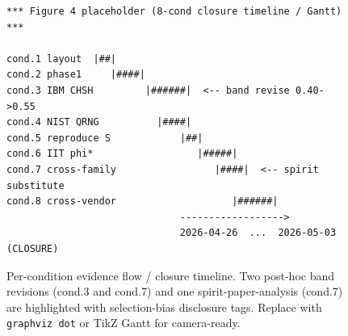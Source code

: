 \begin{figure}[htbp]
\centering
\begin{lstlisting}[basicstyle=\ttfamily\tiny,frame=single,framesep=4pt]
*** Figure 4 placeholder (8-cond closure timeline / Gantt) ***

cond.1 layout  |##|
cond.2 phase1     |####|
cond.3 IBM CHSH         |######|  <-- band revise 0.40->0.55
cond.4 NIST QRNG          |####|
cond.5 reproduce S            |##|
cond.6 IIT phi*                  |#####|
cond.7 cross-family                 |####|  <-- spirit substitute
cond.8 cross-vendor                    |######|
                              ------------------>
                              2026-04-26  ...  2026-05-03 (CLOSURE)
\end{lstlisting}
\caption{Per-condition evidence flow / closure timeline. Two
post-hoc band revisions (cond.3 and cond.7) and one
spirit-paper-analysis (cond.7) are highlighted with selection-bias
disclosure tags. Replace with \texttt{graphviz dot} or TikZ Gantt
for camera-ready.}
\label{fig:closure_evidence_flow}
\end{figure}
